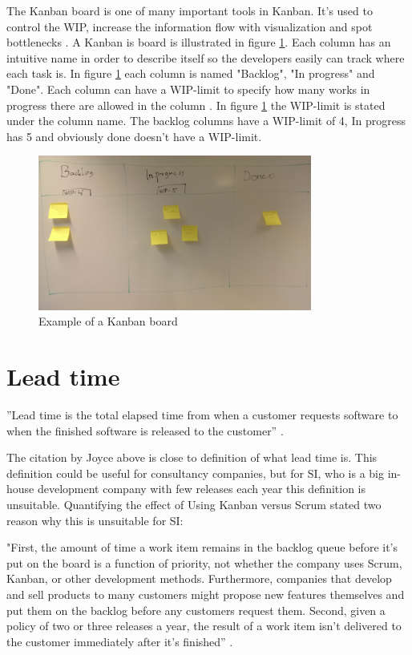 \documentclass[UKenglish]{ifimaster}  %
\begin{document}
The Kanban board is one of many important tools in Kanban. It's used to control the WIP, increase the information flow with visualization and spot bottlenecks \parencite{SMR:SMR1599}. A Kanban is board is illustrated in figure \ref{kanban_board}. Each column has an intuitive name in order to describe itself so the developers easily can track where each task is. In figure \ref{kanban_board} each column is named "Backlog", "In progress" and "Done".  Each column can have a WIP-limit to specify how many works in progress there are allowed in the column \parencite{Joyce}. In figure \ref{kanban_board} the WIP-limit is stated under the column name. The backlog columns have a WIP-limit of 4, In progress has 5 and obviously done doesn't have a WIP-limit.
\begin{figure}[ht!]
\centering
\includegraphics[width=90mm]{Picture/kanban_board.jpg}
\caption{Example of a Kanban board}
\label{kanban_board}
\end{figure}

\section {Lead time}
''Lead time is the total elapsed time from when a customer requests software to when the finished software is released to the customer'' \parencite{Joyce}.

The citation by Joyce above is close to definition of what lead time is. This definition could be useful for consultancy companies, but for SI, who is a big in-house development company with few releases each year this definition is unsuitable. Quantifying the effect of Using Kanban versus Scrum stated  two reason why this is unsuitable for SI: 

"First, the amount of time a work item remains in the backlog queue before it's put on the board is a function of priority, not whether the company uses Scrum, Kanban, or other development methods. Furthermore, companies that develop and sell products to many customers might propose new features themselves and put them on the backlog before any customers request them. Second, given a policy of two or three releases a year, the result of a work item isn't delivered to the customer immediately after it's finished'' \parencite{Dag}.
\end{document}
